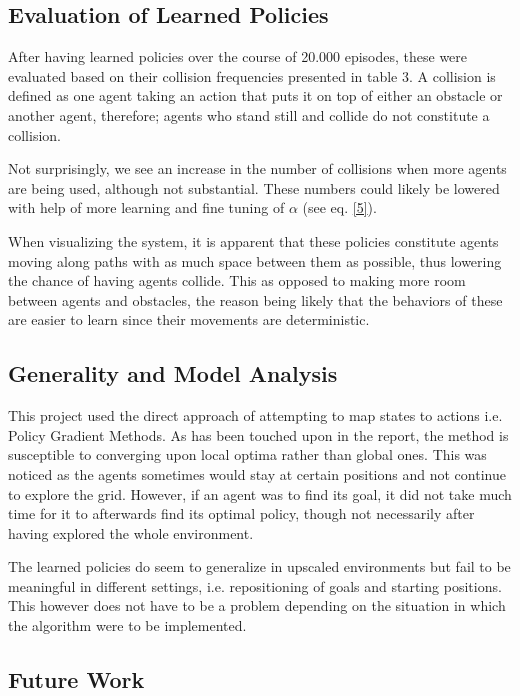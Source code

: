 \documentclass[journal,twoside]{IEEEtran}
\begin{document}
\subsection{Evaluation of Learned Policies}

After having learned policies over the course of 20.000 episodes, these were evaluated based on their collision frequencies presented in table 3. A collision is defined as one agent taking an action that puts it on top of either an obstacle or another agent, therefore; agents who stand still and collide do not constitute a collision. 

Not surprisingly, we see an increase in the number of collisions when more agents are being used, although not substantial. These numbers could likely be lowered with help of more learning and fine tuning of $\alpha$ (see eq. \eqref{5}). 

When visualizing the system, it is apparent that these policies constitute agents moving along paths with as much space between them as possible, thus lowering the chance of having agents collide. This as opposed to making more room between agents and obstacles, the reason being likely that the behaviors of these are easier to learn since their movements are deterministic.
 
\subsection{Generality and Model Analysis}

This project used the direct approach of attempting to map states to actions i.e. Policy Gradient Methods. As has been touched upon in the report, the method is susceptible to converging upon local optima rather than global ones. This was noticed as the agents sometimes would stay at certain positions and not continue to explore the grid. However, if an agent was to find its goal, it did not take much time for it to afterwards find its optimal policy, though not necessarily after having explored the whole environment. 

The learned policies do seem to generalize in upscaled environments but fail to be meaningful in different settings, i.e. repositioning of goals and starting positions. This however does not have to be a problem depending on the situation in which the algorithm were to be implemented.

\subsection{Future Work}
\end{document}
